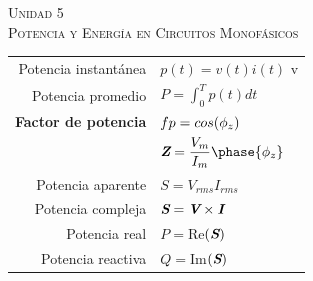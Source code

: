 \documentclass[11pt,a4paper,twocolumn]{article}
\newcommand{\fasor}[1]{\textit{\textbf{#1}}}
\newcommand{\unidad}[2]{\begin{center}
		\fontsize{10}{10}\selectfont\color{gray!50!black}\scshape Unidad #1 \\
		\fontsize{14}{14}\selectfont \scshape #2
\end{center} \vspace{-.6cm}}
\begin{document}
	
	
\unidad{5}{Potencia y Energía en Circuitos Monofásicos}
	\begin{tcolorbox}[colback=white!97!brown, colframe=brown!15!gray]
		
		\begin{tabular}{r l}
			
			Potencia instantánea & $p(t)=v(t)i(t)$ v\\
			Potencia promedio & $P=\displaystyle\int_{0}^{T} p(t) dt$ \\
			\textbf{Factor de potencia} & $fp=cos(\phi_{z}) \hspace{.3cm} $ \\
			& $\fasor{Z}=\dfrac{V_{m}}{I_{m}}\phase{\phi_{z}}$ \\
			Potencia aparente & $S=V_{rms}I_{rms}$ \\
			Potencia compleja & $\fasor{S}=\fasor{V} \times \fasor{I}$ \\
			Potencia real & $P=$Re$(\fasor{S})$ \\
			Potencia reactiva & $Q=$Im$(\fasor{S})$ \\
		\end{tabular}
		
	\end{tcolorbox}


\newpage



\end{document}
